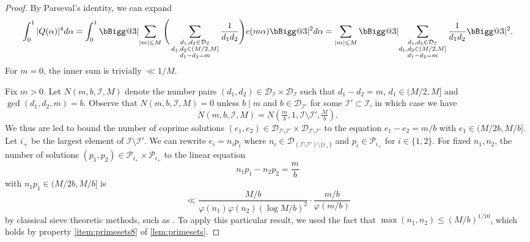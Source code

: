 \documentclass[11pt]{amsart}
\makeatletter
\theoremstyle{definition}
\renewcommand{\leq}{\leqslant}
\newcommand{\primes}{\mathcal{P}}
\newcommand{\D}{\mathcal{D}}
\renewcommand{\d}{\boldsymbol{d}}
\newcommand{\indexset}{\mathcal{I}}
\newcommand{\otherindexset}{\mathcal{I'}}
\newcommand{\otherK}{M}
\newcommand{\vast}{\bBigg@{3}}
\makeatother
\begin{document}
\begin{proof}
By Parseval's identity, we can expand
\begin{equation*}
\int_{0}^1 |Q(\alpha)|^4 d\alpha = \int_{0}^1 \vast\lvert \sum_{|m|\leq \otherK} \Bigg(\sum_{\substack{d_1,d_2\in \D_{\indexset}\\ d_1, d_2\in (\otherK/2, \otherK] \\d_1-d_2=m}}\frac{1}{d_1d_2}\Bigg) e(m\alpha)\vast\rvert^2 d\alpha = \sum_{|m|\leq \otherK}  \vast\lvert \sum_{\substack{d_1,d_2\in \D_{\indexset}\\ d_1, d_2\in (\otherK/2, \otherK] \\d_1-d_2=m}}\frac{1}{d_1d_2} \vast\rvert^2.
\end{equation*}
For $m=0$, the inner sum is trivially $\ll 1/{\otherK}$. 

Fix $m> 0$. Let $N(m, b, \indexset, \otherK)$ denote the number pairs $(d_1, d_2)\in \D_{\indexset}\times \D_{\indexset}$ such that $d_1-d_2 = m$, $d_1\in (\otherK/2,\otherK]$ and ${\gcd(d_1, d_2, m) = b}$. Observe that $N(m, b, \indexset, \otherK) = 0$ unless $b\mid m$ and $b\in \D_{\otherindexset}$ for some $\otherindexset\subset \indexset$, in which case we have
\begin{equation*}
N(m, b, \indexset, \otherK) = N\left(\tfrac{m}{b}, 1, \indexset\setminus \otherindexset, \tfrac{\otherK}{b}\right).
\end{equation*}
We thus are led to bound the number of coprime solutions $(e_1, e_2)\in \D_{\indexset\setminus \otherindexset}\times \D_{\indexset\setminus \otherindexset}$ to the equation $e_1-e_2 = m/b$ with $e_1\in (\otherK/2b, \otherK/b]$. Let $i_+$ be the largest element of $\indexset\setminus \otherindexset$. We can rewrite $e_i = n_i p_i$ where $n_i\in \D_{(\indexset\setminus \otherindexset) \setminus \{i_+\}}$ and $p_i\in \primes_{i_+}$ for $i\in \{1,2\}$. For fixed $n_1, n_2$, the number of solutions $(p_1, p_2)\in \primes_{i_+}\times \primes_{i_+}$ to the linear equation
\begin{equation*}
n_1p_1 - n_2p_2 = \frac{m}{b}
\end{equation*}
with $n_1p_1\in (\otherK/2b, \otherK/b]$ is 
\begin{equation*}
\ll \frac{\otherK/b}{\varphi(n_1)\varphi(n_2)(\log \otherK/b)^2} \cdot \frac{m/b}{\varphi(m/b)} 
\end{equation*}
by classical sieve theoretic methods, such as \cite[Proposition~6.22]{opera}. To apply this particular result, we used the fact that $\max(n_1, n_2) \leq (\otherK/b)^{1/10}$, which holds by property \cref{item:primesets8} of \cref{lem:primesets}.


\end{proof}
\end{document}
